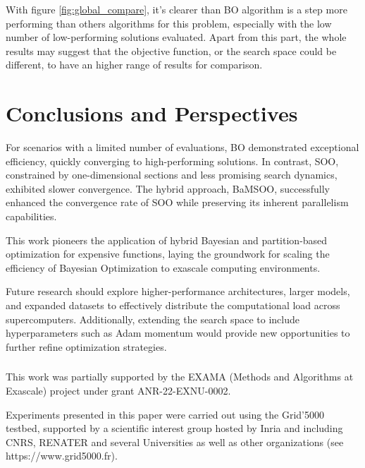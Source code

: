 \documentclass[runningheads]{llncs}
\begin{document}
With figure \ref{fig:global_compare}, it's clearer than BO algorithm is a step more performing than others algorithms for this problem, especially with the low number of low-performing solutions evaluated. Apart from this part, the whole results may suggest that the objective function, or the search space could be different, to have an higher range of results for comparison. 

\section{Conclusions and Perspectives}
\label{sec:conclusion}

For scenarios with a limited number of evaluations, BO demonstrated exceptional efficiency, quickly converging to high-performing solutions. In contrast, SOO, constrained by one-dimensional sections and less promising search dynamics, exhibited slower convergence. The hybrid approach, BaMSOO, successfully enhanced the convergence rate of SOO while preserving its inherent parallelism capabilities.

This work pioneers the application of hybrid Bayesian and partition-based optimization for expensive functions, laying the groundwork for scaling the efficiency of Bayesian Optimization to exascale computing environments.

Future research should explore higher-performance architectures, larger models, and expanded datasets to effectively distribute the computational load across supercomputers. Additionally, extending the search space to include hyperparameters such as Adam momentum would provide new opportunities to further refine optimization strategies.



\subsubsection{\ackname} 

This work was partially supported by the EXAMA (Methods and Algorithms at Exascale) project under grant ANR-22-EXNU-0002.

Experiments presented in this paper were carried out using the Grid'5000 testbed, supported by a scientific interest group hosted by Inria and including CNRS, RENATER and several Universities as well as other organizations (see https://www.grid5000.fr).



% 
% 
\printbibliography
\end{document}
